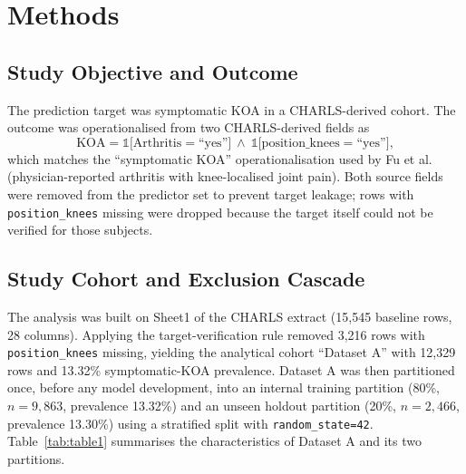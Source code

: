 \documentclass[11pt,a4paper]{article}
\begin{document}
\section{Methods}

\subsection{Study Objective and Outcome}
The prediction target was symptomatic KOA in a CHARLS-derived cohort. The outcome was operationalised
from two CHARLS-derived fields as
\[
\text{KOA} = \mathbb{1}\bigl[\text{Arthritis} = \text{``yes''}\bigr]\ \wedge\
\mathbb{1}\bigl[\text{position\_knees} = \text{``yes''}\bigr],
\]
\noindent which matches the ``symptomatic KOA'' operationalisation used by Fu et al.\cite{Fu2025}
(physician-reported arthritis with knee-localised joint pain). Both source fields were removed from the
predictor set to prevent target leakage; rows with \texttt{position\_knees} missing were dropped because
the target itself could not be verified for those subjects.

\subsection{Study Cohort and Exclusion Cascade}
The analysis was built on Sheet1 of the CHARLS extract (15{,}545 baseline rows, 28 columns). Applying
the target-verification rule removed 3{,}216 rows with \texttt{position\_knees} missing, yielding the
analytical cohort ``Dataset A'' with 12{,}329 rows and 13.32\% symptomatic-KOA prevalence. Dataset A
was then partitioned once, before any model development, into an internal training partition
(80\%, $n=9{,}863$, prevalence 13.32\%) and an unseen holdout partition (20\%, $n=2{,}466$, prevalence
13.30\%) using a stratified split with \texttt{random\_state=42}. Table~\ref{tab:table1} summarises
the characteristics of Dataset A and its two partitions.
\end{document}

